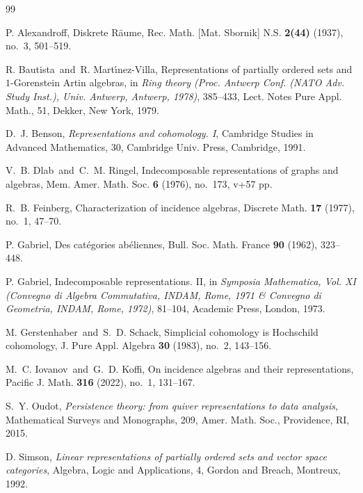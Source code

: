 \documentclass[a4paper]{amsart}
\theoremstyle{plain}
\theoremstyle{definition}
\theoremstyle{remark}
\numberwithin{equation}{section}
\begin{document}
\begin{thebibliography}{99}

 P. Alexandroff,
Diskrete R\"aume,
Rec. Math. [Mat. Sbornik] N.S.  {\bf 2(44)} (1937),  no.~3, 501--519.    

 R. Bautista\ and\ R. Mart\'{\i}nez-Villa,
  Representations of partially ordered sets and $1$-Gorenstein Artin
  algebras, in {\it Ring theory (Proc. Antwerp Conf. (NATO Adv. Study
    Inst.), Univ. Antwerp, Antwerp, 1978)}, 385--433, Lect. Notes Pure
  Appl. Math., 51, Dekker, New York, 1979.

 D.~J. Benson, {\it Representations and
    cohomology. I}, Cambridge Studies in Advanced Mathematics, 30,
  Cambridge Univ. Press, Cambridge, 1991.

 V.~B. Dlab\ and\ C.~M. Ringel, Indecomposable
  representations of graphs and algebras, Mem. Amer. Math. Soc. {\bf
    6} (1976), no.~173, {\rm v}+57 pp.

 R.~B. Feinberg, Characterization of incidence
  algebras, Discrete Math. {\bf 17} (1977), no.~1, 47--70.

 P. Gabriel, Des cat\'{e}gories ab\'{e}liennes,
  Bull. Soc. Math. France {\bf 90} (1962), 323--448.

 P. Gabriel, Indecomposable representations. II, in
  {\it Symposia Mathematica, Vol. XI (Convegno di Algebra Commutativa,
    INDAM, Rome, 1971 \& Convegno di Geometria, INDAM, Rome, 1972)},
  81--104, Academic Press, London, 1973.

 M. Gerstenhaber\ and\ S.~D. Schack, Simplicial
  cohomology is Hochschild cohomology, J. Pure Appl. Algebra {\bf 30}
  (1983), no.~2, 143--156.
  
 M.~C. Iovanov\ and\ G.~D. Koffi, On incidence
  algebras and their representations, Pacific J. Math. {\bf 316}
  (2022), no.~1, 131--167.

 S.~Y. Oudot, {\it Persistence theory: from quiver
    representations to data analysis}, Mathematical Surveys and
  Monographs, 209, Amer. Math. Soc., Providence, RI, 2015.

 D. Simson, {\it Linear representations of partially
    ordered sets and vector space categories}, Algebra, Logic and
  Applications, 4, Gordon and Breach, Montreux, 1992.

\end{thebibliography}
\end{document}
